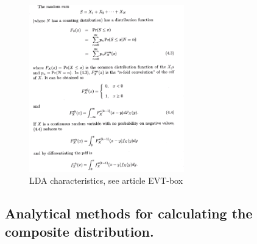 \documentclass{article}
\begin{document}
\begin{figure}[H]
  \caption{LDA characteristics, see article EVT-box}
  \centering
    \includegraphics[width=0.6\textwidth]{ldachar}
\end{figure}











\subsection{Analytical methods for calculating the composite distribution.}
\end{document}
